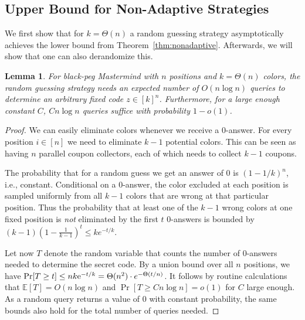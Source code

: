 \documentclass[english,a4paper,11pt]{article}
\newcommand{\e}{\textup{e}}
\newtheorem{lemma}[theorem]{Lemma}
\begin{document}
{\subsection{Upper Bound for Non-Adaptive Strategies}

We first show that for $k = \Theta(n)$ a random guessing strategy asymptotically achieves the lower bound from Theorem~\ref{thm:nonadaptive}. Afterwards, we will show that one can also derandomize this.



\begin{lemma} 
\label{lem:random-guessing}
For black-peg Mastermind with $n$ positions and $k=\Theta(n)$ colors, the random guessing strategy needs an expected number of $O(n \log n)$ queries to determine an arbitrary fixed code $z\in[k]^n$. Furthermore, for a large enough constant $C$, $Cn\log n$ queries suffice with probability $1-o(1)$.

\end{lemma}


\begin{proof}
We can easily eliminate colors whenever we receive a $0$-answer. For every position $i \in [n]$ we need to eliminate $k-1$ potential colors. This can be seen as having $n$ parallel coupon collectors, each of which needs to collect $k-1$ coupons.


The probability that for a random guess we get an answer of $0$ is $(1-1/k)^n$, i.e., constant. Conditional on a $0$-answer, the color excluded at each position is sampled uniformly from all $k-1$ colors that are wrong at that particular position. Thus the probability that at least one of the $k-1$ wrong colors at one fixed position is \emph{not} eliminated by the first $t$ $0$-answers is bounded by $(k-1)(1-\frac{1}{k-1})^t\leq k e^{-t/k}$.

Let now $T$ denote the random variable that counts the number of $0$-answers needed to determine the secret code. By a union bound over all $n$ positions, we have $\Pr[T\geq t]\leq nk\e^{-t/k}=\Theta(n^2)\cdot e^{-\Theta(t/n)}$. It follows by routine calculations that $\mathbb{E}[T]=O(n\log n)$ and $\Pr[T\geq Cn\log n]=o(1)$ for $C$ large enough. As a random query returns a value of $0$ with constant probability, the same bounds also hold for the total number of queries needed.
\end{proof}


}
\end{document}
